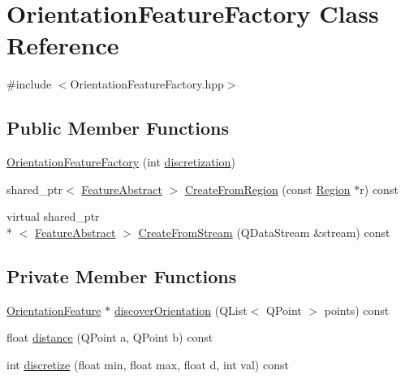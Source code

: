 \hypertarget{class_orientation_feature_factory}{\section{Orientation\+Feature\+Factory Class Reference}
\label{class_orientation_feature_factory}
}


{\ttfamily \#include $<$Orientation\+Feature\+Factory.\+hpp$>$}

\subsection*{Public Member Functions}
\begin{DoxyCompactItemize}
\item 
\hyperlink{class_orientation_feature_factory_ad78c564940442d3c76db9ef03d6c8a03}{Orientation\+Feature\+Factory} (int \hyperlink{class_orientation_feature_factory_abcd8932fe77877dff6657e4070882015}{discretization})
\item 
shared\+\_\+ptr$<$ \hyperlink{class_feature_abstract}{Feature\+Abstract} $>$ \hyperlink{class_orientation_feature_factory_a63e1b4d41e32beb17f523a04479785ee}{Create\+From\+Region} (const \hyperlink{class_region}{Region} $\ast$r) const 
\item 
virtual shared\+\_\+ptr\\*
$<$ \hyperlink{class_feature_abstract}{Feature\+Abstract} $>$ \hyperlink{class_orientation_feature_factory_a00bccb3e3b4f551374f7f3e0a80e9837}{Create\+From\+Stream} (Q\+Data\+Stream \&stream) const 
\end{DoxyCompactItemize}
\subsection*{Private Member Functions}
\begin{DoxyCompactItemize}
\item 
\hyperlink{class_orientation_feature}{Orientation\+Feature} $\ast$ \hyperlink{class_orientation_feature_factory_a3ba5ebad39d7b2b6d1065208ee2fb60e}{discover\+Orientation} (Q\+List$<$ Q\+Point $>$ points) const 
\item 
float \hyperlink{class_orientation_feature_factory_a68e87a390c95060cac05065757daa18d}{distance} (Q\+Point a, Q\+Point b) const 
\item 
int \hyperlink{class_orientation_feature_factory_a280c15eebea7646e9b602c36979b8b16}{discretize} (float min, float max, float d, int val) const 
\end{DoxyCompactItemize}
